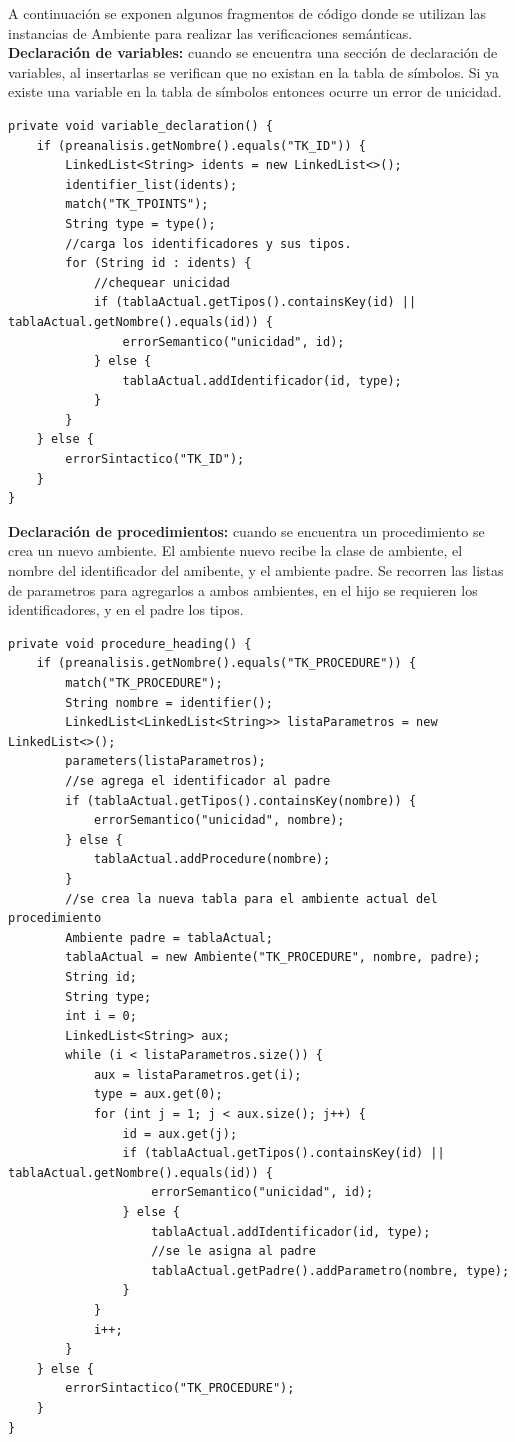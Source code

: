 A continuación se exponen algunos fragmentos de código donde se utilizan las instancias de Ambiente para realizar las verificaciones semánticas.\\

\textbf{Declaración de variables:} cuando se encuentra una sección de declaración de variables, al insertarlas se verifican que no existan en la tabla de símbolos. Si ya existe una variable en la tabla de símbolos entonces ocurre un error de unicidad.

\begin{verbatim}
private void variable_declaration() {
	if (preanalisis.getNombre().equals("TK_ID")) {
		LinkedList<String> idents = new LinkedList<>();
		identifier_list(idents);
		match("TK_TPOINTS");
		String type = type();
		//carga los identificadores y sus tipos.
		for (String id : idents) {
			//chequear unicidad
			if (tablaActual.getTipos().containsKey(id) || tablaActual.getNombre().equals(id)) {
				errorSemantico("unicidad", id);
			} else {
				tablaActual.addIdentificador(id, type);
			}
		}
	} else {
		errorSintactico("TK_ID");
	}
}
\end{verbatim}

\textbf{Declaración de procedimientos:} cuando se encuentra un procedimiento se crea un nuevo ambiente. El ambiente nuevo recibe la clase de ambiente, el nombre del identificador del amibente, y el ambiente padre. Se recorren las listas de parametros para agregarlos a ambos ambientes, en el hijo se requieren los identificadores, y en el padre los tipos. 

\begin{verbatim}
private void procedure_heading() {
	if (preanalisis.getNombre().equals("TK_PROCEDURE")) {
		match("TK_PROCEDURE");
		String nombre = identifier();
		LinkedList<LinkedList<String>> listaParametros = new LinkedList<>();
		parameters(listaParametros);
		//se agrega el identificador al padre
		if (tablaActual.getTipos().containsKey(nombre)) {
			errorSemantico("unicidad", nombre);
		} else {
			tablaActual.addProcedure(nombre);
		}
		//se crea la nueva tabla para el ambiente actual del procedimiento
		Ambiente padre = tablaActual;
		tablaActual = new Ambiente("TK_PROCEDURE", nombre, padre);
		String id;
		String type;
		int i = 0;
		LinkedList<String> aux;
		while (i < listaParametros.size()) {
			aux = listaParametros.get(i);
			type = aux.get(0);
			for (int j = 1; j < aux.size(); j++) {
				id = aux.get(j);
				if (tablaActual.getTipos().containsKey(id) || tablaActual.getNombre().equals(id)) {
					errorSemantico("unicidad", id);
				} else {
					tablaActual.addIdentificador(id, type);
					//se le asigna al padre 
					tablaActual.getPadre().addParametro(nombre, type);
				}
			}
			i++;
		}
	} else {
		errorSintactico("TK_PROCEDURE");
	}
}
\end{verbatim}

